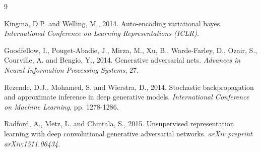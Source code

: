 \documentclass[11pt]{article}
\begin{document}

\begin{thebibliography}{9}

Kingma, D.P. and Welling, M., 2014.
Auto-encoding variational bayes.
\textit{International Conference on Learning Representations (ICLR)}.

Goodfellow, I., Pouget-Abadie, J., Mirza, M., Xu, B., Warde-Farley, D., Ozair, S., Courville, A. and Bengio, Y., 2014.
Generative adversarial nets.
\textit{Advances in Neural Information Processing Systems}, 27.

Rezende, D.J., Mohamed, S. and Wierstra, D., 2014.
Stochastic backpropagation and approximate inference in deep generative models.
\textit{International Conference on Machine Learning}, pp. 1278-1286.

Radford, A., Metz, L. and Chintala, S., 2015.
Unsupervised representation learning with deep convolutional generative adversarial networks.
\textit{arXiv preprint arXiv:1511.06434}.

\end{thebibliography}
\end{document}
